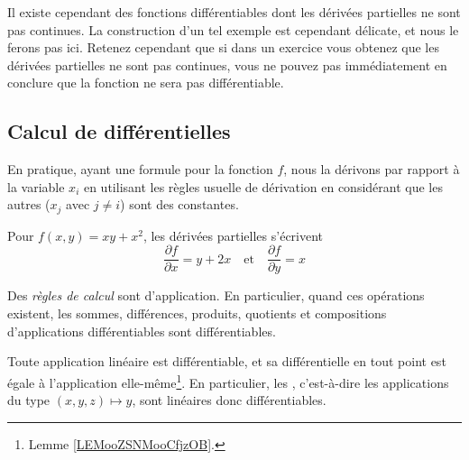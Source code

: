 \begin{remark}
	Il existe cependant des fonctions différentiables dont les dérivées partielles ne sont pas continues. La construction d'un tel exemple est cependant délicate, et nous le ferons pas ici. Retenez cependant que si dans un exercice vous obtenez que les dérivées partielles ne sont pas continues, vous ne pouvez pas immédiatement en conclure que la fonction ne sera pas différentiable.
\end{remark}

\subsection{Calcul de différentielles}

\begin{normaltext} \label{deriveepartielles}
	En pratique, ayant une formule pour la fonction \( f\), nous la dérivons par rapport à la variable \( x_i\) en utilisant les règles usuelle de dérivation en considérant que les autres (\( x_j\) avec \( j \neq i\)) sont des constantes.
\end{normaltext}

\begin{example}Pour \( f(x,y) = xy + x^2\), les dérivées partielles
	s'écrivent
	\begin{equation*}
		\frac{\partial f}{\partial x} = y + 2x \quad\text{et}\quad \frac{\partial f}{\partial y} = x
	\end{equation*}
\end{example}


Des \emph{règles de calcul} sont d'application. En particulier, quand
ces opérations existent, les sommes, différences, produits, quotients
et compositions d'applications différentiables sont différentiables.

Toute application linéaire est différentiable, et sa différentielle en
tout point est égale à l'application elle-même\footnote{Lemme \ref{LEMooZSNMooCfjzOB}.}. En particulier, les
, c'est-à-dire les applications du type
\( (x,y,z) \mapsto y\), sont linéaires donc différentiables.


